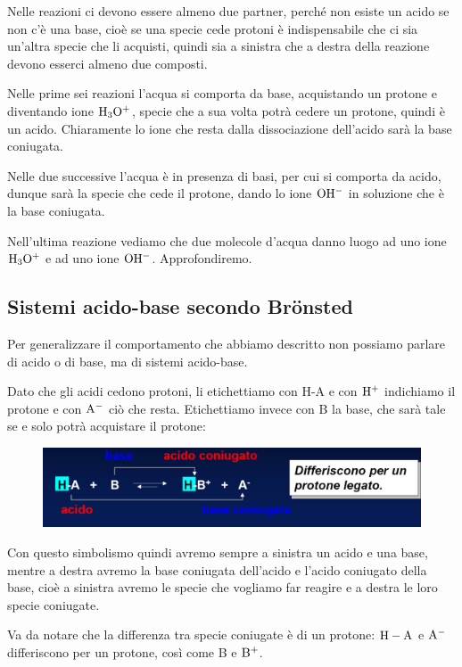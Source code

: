 Nelle reazioni ci devono essere almeno due partner, perché non esiste un acido se non c'è una base, cioè se una specie cede protoni è indispensabile che ci sia un'altra specie che li acquisti, quindi sia a sinistra che a destra della reazione devono esserci almeno due composti.

Nelle prime sei reazioni l'acqua si comporta da base, acquistando un protone e diventando ione $\rm H_3O^+$, specie che a sua volta potrà cedere un protone, quindi è un acido. Chiaramente lo ione che resta dalla dissociazione dell'acido sarà la base coniugata.

Nelle due successive l'acqua è in presenza di basi, per cui si comporta da acido, dunque sarà la specie che cede il protone, dando lo ione $\rm OH^-$ in soluzione che è la base coniugata.

Nell'ultima reazione vediamo che due molecole d'acqua danno luogo ad uno ione $\rm H_3O^+$ e ad uno ione $\rm OH^-$. Approfondiremo.
\subsection{Sistemi acido-base secondo Brönsted}
Per generalizzare il comportamento che abbiamo descritto non possiamo parlare di acido o di base, ma di sistemi acido-base.

Dato che gli acidi cedono protoni, li etichettiamo con H-A e con $\rm H^+$ indichiamo il protone e con $\rm A^-$ ciò che resta. Etichettiamo invece con B la base, che sarà tale se e solo potrà acquistare il protone:

\begin{figure}[H]
    \centering
    \includegraphics[width=12cm]{immagini/acido_base_coniugata.png}
\end{figure}

Con questo simbolismo quindi avremo sempre a sinistra un acido e una base, mentre a destra avremo la base coniugata dell'acido e l'acido coniugato della base, cioè a sinistra avremo le specie che vogliamo far reagire e a destra le loro specie coniugate.

Va da notare che la differenza tra specie coniugate è di un protone: $\rm H-A$ e $\rm A^-$ differiscono per un protone, così come B e $\rm B^+$.

